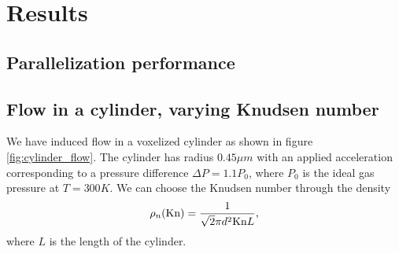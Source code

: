 \section{Results}
\subsection{Parallelization performance}
\label{sec:dsmc_parallelization_performance}
\subsection{Flow in a cylinder, varying Knudsen number}
We have induced flow in a voxelized cylinder as shown in figure \ref{fig:cylinder_flow}. The cylinder has radius $0.45 \mu m$ with an applied acceleration corresponding to a pressure difference $\Delta P = 1.1P_0$, where $P_0$ is the ideal gas pressure at $T=300K$. We can choose the Knudsen number through the density
\begin{align}
	\rho_n(\text{Kn}) = {1\over \sqrt 2 \pi d^2 \text{Kn}L},
\end{align}
where $L$ is the length of the cylinder. 

